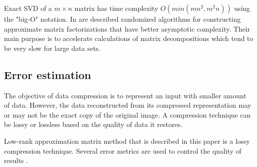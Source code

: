 Exact SVD of a $m \times n$ matrix has time complexity $O(min(mn^2, m^2n))$ using the "big-O" notation. In \cite{Holmes2007, Candes2011, Woolfe2008, Martinsson2011} are described randomized algorithms for constructing approximate matrix factorizations that have better asymptotic complexity. Their main purpose is to accelerate calculations of matrix decompositions which tend to be very slow for large data sets.

\subsection{Error estimation}
\label{sec:error}

The objective of data compression is to represent an input with smaller amount of data. However, the data reconstructed from its compressed representation may or may not be the exact copy of the original image. A compression technique can be lossy or lossless based on the quality of data it restores.

Low-rank approximation matrix method that is described in this paper is a lossy compression technique. Several error metrics are used to control the quality of results \cite{SairaBanu2015}.

